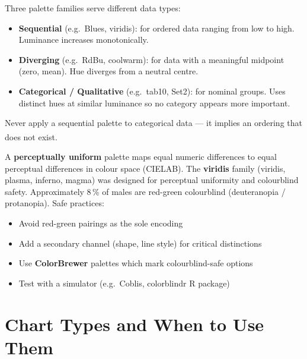 \begin{tcbitemize}[ skin=sectionraster ]
    \tcbitem[title={Colour Palette Types}, raster multicolumn=3]
    Three palette families serve different data types:
    \begin{itemize}
        \item \textbf{Sequential} (e.g.\ Blues, viridis): for ordered data ranging from low to
              high. Luminance increases monotonically.
        \item \textbf{Diverging} (e.g.\ RdBu, coolwarm): for data with a meaningful midpoint
              (zero, mean). Hue diverges from a neutral centre.
        \item \textbf{Categorical / Qualitative} (e.g.\ tab10, Set2): for nominal groups.
              Uses distinct hues at similar luminance so no category appears more important.
    \end{itemize}
    Never apply a sequential palette to categorical data --- it implies an ordering that
    does not exist\textsuperscript{\cite[][pp.~120--135]{jansenHandbuchInfografik1999}}.

    \tcbitem[title={Perceptual Uniformity and Colourblind Safety}, raster multicolumn=3]
    A \textbf{perceptually uniform} palette maps equal numeric differences to equal
    perceptual differences in colour space (CIELAB). The \textbf{viridis} family
    (viridis, plasma, inferno, magma) was designed for perceptual uniformity and
    colourblind safety. Approximately 8\,\% of males are red-green colourblind (deuteranopia /
    protanopia). Safe practices:
    \begin{itemize}
        \item Avoid red-green pairings as the sole encoding
        \item Add a secondary channel (shape, line style) for critical distinctions
        \item Use \textbf{ColorBrewer} palettes which mark colourblind-safe options
        \item Test with a simulator (e.g.\ Coblis, colorblindr R package)
    \end{itemize}
\end{tcbitemize}

\section{Chart Types and When to Use Them}

